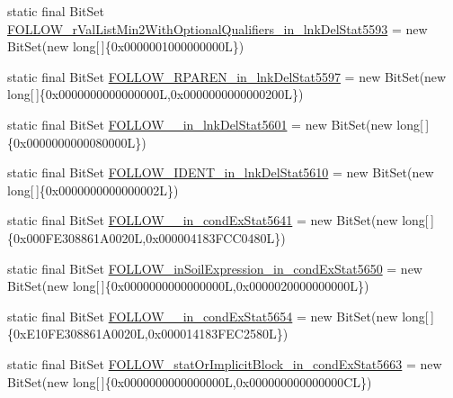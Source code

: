 \begin{DoxyCompactItemize}
\item 
static final Bit\-Set \hyperlink{classorg_1_1tzi_1_1use_1_1parser_1_1testsuite_1_1_test_suite_parser_adf5940d96bbf204685c3f6d69a96a8b5}{F\-O\-L\-L\-O\-W\-\_\-r\-Val\-List\-Min2\-With\-Optional\-Qualifiers\-\_\-in\-\_\-lnk\-Del\-Stat5593} = new Bit\-Set(new long\mbox{[}$\,$\mbox{]}\{0x0000001000000000\-L\})
\item 
static final Bit\-Set \hyperlink{classorg_1_1tzi_1_1use_1_1parser_1_1testsuite_1_1_test_suite_parser_a4f30a4d647197b9c3125603befc14e9f}{F\-O\-L\-L\-O\-W\-\_\-\-R\-P\-A\-R\-E\-N\-\_\-in\-\_\-lnk\-Del\-Stat5597} = new Bit\-Set(new long\mbox{[}$\,$\mbox{]}\{0x0000000000000000\-L,0x0000000000000200\-L\})
\item 
static final Bit\-Set \hyperlink{classorg_1_1tzi_1_1use_1_1parser_1_1testsuite_1_1_test_suite_parser_a277c3ce3e5ef01cfc5feae26cca039fb}{F\-O\-L\-L\-O\-W\-\_\-\_\-in\-\_\-lnk\-Del\-Stat5601} = new Bit\-Set(new long\mbox{[}$\,$\mbox{]}\{0x0000000000080000\-L\})
\item 
static final Bit\-Set \hyperlink{classorg_1_1tzi_1_1use_1_1parser_1_1testsuite_1_1_test_suite_parser_aedd5f7a34e896f41b4377dffd9e04007}{F\-O\-L\-L\-O\-W\-\_\-\-I\-D\-E\-N\-T\-\_\-in\-\_\-lnk\-Del\-Stat5610} = new Bit\-Set(new long\mbox{[}$\,$\mbox{]}\{0x0000000000000002\-L\})
\item 
static final Bit\-Set \hyperlink{classorg_1_1tzi_1_1use_1_1parser_1_1testsuite_1_1_test_suite_parser_a88f4fe3cefec83d1bcf3cd9249a154d5}{F\-O\-L\-L\-O\-W\-\_\-\_\-in\-\_\-cond\-Ex\-Stat5641} = new Bit\-Set(new long\mbox{[}$\,$\mbox{]}\{0x000\-F\-E308861\-A0020\-L,0x000004183\-F\-C\-C0480\-L\})
\item 
static final Bit\-Set \hyperlink{classorg_1_1tzi_1_1use_1_1parser_1_1testsuite_1_1_test_suite_parser_a4172c254347cb19c7b66b2882b326c08}{F\-O\-L\-L\-O\-W\-\_\-in\-Soil\-Expression\-\_\-in\-\_\-cond\-Ex\-Stat5650} = new Bit\-Set(new long\mbox{[}$\,$\mbox{]}\{0x0000000000000000\-L,0x0000020000000000\-L\})
\item 
static final Bit\-Set \hyperlink{classorg_1_1tzi_1_1use_1_1parser_1_1testsuite_1_1_test_suite_parser_adced16a07cd4c7ecd05e9142dfc2a793}{F\-O\-L\-L\-O\-W\-\_\-\_\-in\-\_\-cond\-Ex\-Stat5654} = new Bit\-Set(new long\mbox{[}$\,$\mbox{]}\{0x\-E10\-F\-E308861\-A0020\-L,0x000014183\-F\-E\-C2580\-L\})
\item 
static final Bit\-Set \hyperlink{classorg_1_1tzi_1_1use_1_1parser_1_1testsuite_1_1_test_suite_parser_a172993cef30a7b97c89acaa84f89267a}{F\-O\-L\-L\-O\-W\-\_\-stat\-Or\-Implicit\-Block\-\_\-in\-\_\-cond\-Ex\-Stat5663} = new Bit\-Set(new long\mbox{[}$\,$\mbox{]}\{0x0000000000000000\-L,0x000000000000000\-C\-L\})

\end{DoxyCompactItemize}
